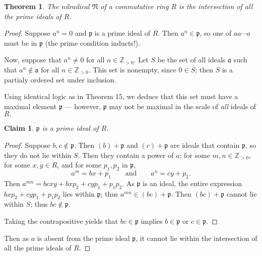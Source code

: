 \documentclass[11pt]{article}
\newtheorem{theorem}{Theorem}
\newtheorem{claim}{Claim}
\begin{document}
\begin{adjustwidth}{0.5cm}{}
	\begin{theorem}
		The nilradical $\mathfrak{N}$ of a commutative ring $R$ is the intersection of all the prime ideals of $R$.
	\end{theorem}
	\begin{proof}
		Suppose $a^{n} = 0$ and $\mathfrak{p}$ is a prime ideal of $R$. Then $a^{n} \in \mathfrak{p}$, so one of $aa \cdots a$ must be in $\mathfrak{p}$ (the prime condition inducts!).

		Now, suppose that $a^{n} \ne 0$ for all $n \in \mathbb{Z}_{> 0}$. Let $S$ be the set of all ideals $\mathfrak{a}$ such that $a^{n} \notin \mathfrak{a}$ for all $n \in \mathbb{Z}_{> 0}$. This set is nonempty, since $0 \in S$; then $S$ is a partialy ordered set under inclusion. 

		Using identical logic as in Theorem 15, we deduce that this set must have a maximal element $\mathfrak{p}$ --- however, $\mathfrak{p}$ may not be maximal in the scale of \textit{all} ideals of $R.$
		\begin{adjustwidth}{0.5cm}{}
			\begin{claim}
				$\mathfrak{p}$ is a prime ideal of $R$.
			\end{claim}
			\begin{proof}\renewcommand{\qedsymbol}{}
				Suppose $b,c \notin \mathfrak{p}$. Then $(b) + \mathfrak{p}$ and $(c) + \mathfrak{p}$ are ideals that contain $\mathfrak{p}$, so they do not lie within $S$. Then they contain a power of $a$; for some $m, n \in \mathbb{Z}_{> 0}$, for some $x, y \in R$, and for some $p_{1}, p_{2}$ in $\mathfrak{p}$,
				\[
					a^{m} = bx + p_{1} \qquad \text{and} \qquad a^{n} = cy + p_{2}.
				\]
				Then $a^{mn} = bcxy + bx p_{2} + cy p_{1} + p_{1}p_{2}$. As $\mathfrak{p}$ is an ideal, the entire expression $bx p_{2} + cy p_{1} + p_{1}p_{2}$ lies within $\mathfrak{p}$; thus $a^{mn} \in (bc) + \mathfrak{p}$. Then $(bc) + \mathfrak{p}$ cannot lie within $S$; thus $bc \notin \mathfrak{p}$. 

				Taking the contrapositive yields that $bc \in \mathfrak{p}$ implies $b \in \mathfrak{p}$ or $c \in \mathfrak{p}$.
			\end{proof}
		\end{adjustwidth}
		Then as $a$ is absent from the prime ideal $\mathfrak{p}$, it cannot lie within the intersection of all the prime ideals of $R$.
	\end{proof}
\end{adjustwidth}
\end{document}
